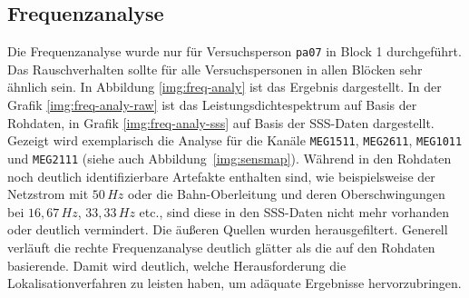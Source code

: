 \documentclass[doc,a4paper,12pt]{apa6}
\begin{document}
\subsection{Frequenzanalyse}
\label{sec:freq-analy}

Die Frequenzanalyse wurde nur für Versuchsperson \texttt{pa07} in Block 1 durchgeführt. Das Rauschverhalten sollte für alle Versuchspersonen in allen Blöcken sehr ähnlich sein. In Abbildung \ref{img:freq-analy} ist das Ergebnis dargestellt. In der Grafik \ref{img:freq-analy-raw} ist das Leistungsdichtespektrum auf Basis der Rohdaten, in Grafik \ref{img:freq-analy-sss} auf Basis der SSS-Daten dargestellt. Gezeigt wird exemplarisch die Analyse für die Kanäle \texttt{MEG1511}, \texttt{MEG2611}, \texttt{MEG1011} und \texttt{MEG2111} (siehe auch Abbildung~\ref{img:sensmap}). Während in den Rohdaten noch deutlich identifizierbare Artefakte enthalten sind, wie beispielsweise der Netzstrom mit $50\,Hz$ oder die Bahn-Oberleitung und deren Oberschwingungen bei $16,67\,Hz$, $33,33\,Hz$ etc., sind diese in den SSS-Daten nicht mehr vorhanden oder deutlich vermindert. Die äußeren Quellen wurden herausgefiltert. Generell verläuft die rechte Frequenzanalyse deutlich glätter als die auf den Rohdaten basierende. Damit wird deutlich, welche Herausforderung die Lokalisationverfahren zu leisten haben, um adäquate Ergebnisse hervorzubringen.
\end{document}
